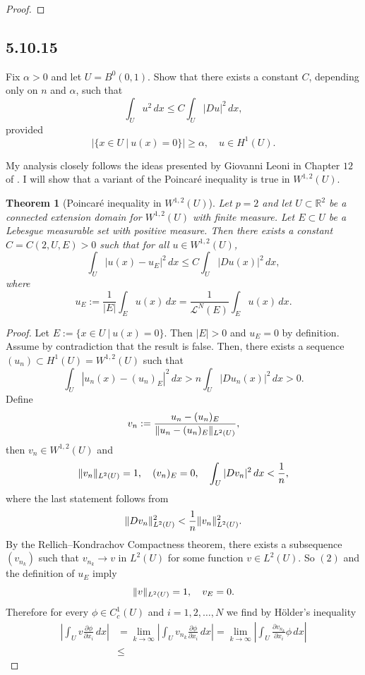 \documentclass{article}
\DeclarePairedDelimiter{\norm}{\lVert}{\rVert}
\newtheorem{theorem}{Theorem}
\begin{document}
\begin{flushleft}
\begin{proof}
\end{proof}


\subsection{\textbf{5.10.15}} Fix $\alpha > 0$ and let $U=B^0(0,1)$. Show that there exists a constant $C$, depending only on $n$ and $\alpha$, such that
$$\int_U u^2\,dx \le C\int_U |Du|^2 \,dx,$$
provided
$$\left|\{x\in U~|~u(x)=0\}\right| \ge \alpha, \quad u\in H^1(U).$$

 My analysis closely follows the ideas presented by Giovanni Leoni in Chapter $12$ of \cite{article}. I will show that a variant of the Poincaré inequality is true in $W^{1,2}(U)$.

\begin{theorem}[Poincaré inequality in $W^{1,2}(U)$] Let $p=2$ and let $U\subset\mathbb R^2$ be a connected extension domain for $W^{1,2}(U)$ with finite measure. Let $E\subset U$ be a Lebesgue measurable set with positive measure. Then there exists a constant $C=C(2,U,E)>0$ such that for all $u\in W^{1,2}(U)$,   \begin{equation}\int_U|u(x)-u_E|^2\,dx\leq C\int_U|Du(x)|^2\,dx,\end{equation}
where  $$  u_E:=\frac{1}{|E|}\int_E u(x)\,dx=\frac{1}{\mathcal{L}^N(E)}\int_E u(x)\,dx.$$
\end{theorem}
\begin{proof}
 Let $E:=\{x\in U~|~u(x)=0\}$. Then $|E|>0$ and  $u_E=0$ by definition. Assume by contradiction that the result is false. Then, there exists a sequence $(u_n)\subset H^1(U)=W^{1,2}(U)$ such that
 $$\int_U \left|u_n(x)-(u_n)_E\right|^2 \,dx > n\int_U |Du_n(x)|^2\,dx>0.$$
 Define
 \begin{equation}v_n:=\frac{u_n-(u_n)_E}{\norm{u_n-(u_n)_E}_{L^2(U)}},\end{equation}
 then $v_n\in W^{1,2}(U)$ and 
 $$\norm{v_n}_{L^2(U)}=1,\quad (v_n)_E=0,\quad \int_U |Dv_n|^2\,dx < \frac{1}{n},$$
 where the last statement follows from
 $$\norm{Dv_n}_{L^2(U)}^2 < \frac{1}{n}\norm{v_n}_{L^2(U)}^2.$$
 By the Rellich–Kondrachov Compactness theorem, there exists a subsequence $(v_{n_k})$ such that $v_{n_k}\to v$ in $L^2(U)$ for some function $v\in L^2(U)$. So $(2)$ and the definition of $u_E$ imply
 $$\norm{v}_{L^2(U)}=1,\quad v_E=0.$$
 Therefore for every $\phi\in C_c^1(U)$ and $i=1,2,\ldots,N$ we find by Hölder's inequality
 \begin{align*}
     \left|\int_U v\frac{\partial \phi}{\partial x_i}\,dx\right|&=\lim_{k\to\infty}\left|\int_U v_{n_k}\frac{\partial \phi}{\partial x_i}\,dx\right|=\lim_{k\to\infty}\left|\int_U \frac{\partial v_{n_k}}{\partial x_i}\phi\,dx\right|\\&\le

\end{align*}
\end{proof}
\end{flushleft}
\end{document}
